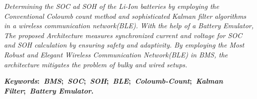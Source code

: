 \thispagestyle{empty} 

\noindent \textit{
    Determining the SOC ad SOH of the Li-Ion batteries by employing the Conventional Coloumb count method and sophisticated Kalman filter algorithms in a wireless communication network(BLE). 
    With the help of a Battery Emulator, The proposed Architecture measures synchronized current and voltage for SOC and SOH calculation by ensuring safety and adaptivity. 
    By employing the Most Robust and Elegant Wireless Communication Network(BLE) in BMS, the architecture mitigates the problem of bulky and wired setups.
}




\vspace{5mm}
\noindent\textbf{\textit{Keywords}:~\textit{BMS};~\textit{SOC};~\textit{SOH};~\textit{BLE};~\textit{Coloumb-Count};~\textit{Kalman Filter};~\textit{Battery Emulator}.}
